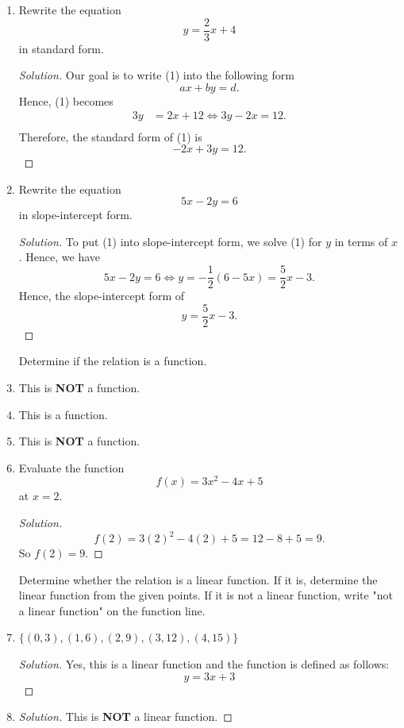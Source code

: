 \documentclass{article}
\begin{document}
\begin{enumerate}
    \begin{proof}[Solution]
    First we put (1) in slope-intercept form by solving for \(y\). Observe that 
    \begin{align*}
        3x + 5y &= 15  \\
        \implies y &= \frac{1}{5}(15 - 3x) \\ 
        \implies y &= 3 - \frac{3}{5} x. 
    \end{align*}
    Since the slope of (1) is \( m = -3/5 \), we must have that the slope of a line perpendicular to it is \( m' = 5 / 3\). Since this perpendicular line goes through \( (0,4 )\), we just have
    \[ y = \frac{5}{3}x + 4.\]
    \end{proof}
\item Rewrite the equation \[ y = \frac{2}{3}x + 4 \tag{1} \] in standard form.
    \begin{proof}[Solution]
    Our goal is to write (1) into the following form 
    \[ ax + by = d.\]
    Hence, (1) becomes 
    \begin{align*}
        3y &= 2x + 12 \iff 3y - 2x = 12. \\
    \end{align*}
    Therefore, the standard form of (1) is 
    \[ -2x + 3y = 12.\]
    \end{proof}
\item Rewrite the equation 
    \[ 5x - 2y = 6 \tag{1}\] in slope-intercept form.
    \begin{proof}[Solution]
    To put (1) into slope-intercept form, we solve (1) for \(y\) in terms of \(x\). Hence, we have \[ 5x -2y = 6 \iff y = -\frac{1}{2} (6 - 5x) = \frac{5}{2}x - 3.\]
    Hence, the slope-intercept form of 
    \[ y = \frac{5}{2}x - 3.\]
    \end{proof}
Determine if the relation is a function. 

\item This is \textbf{NOT} a function. 
\item This is a function.
\item This is \textbf{NOT} a function.
\item Evaluate the function
    \[ f(x) = 3x^2 - 4x + 5\]
at \( x = 2 \). 
\begin{proof}[Solution]
\[ f(2) = 3(2)^2 - 4(2) + 5 = 12 - 8 + 5 = 9.  \]
So \( f(2) = 9 \).
\end{proof}

Determine whether the relation is a linear function. If it is, determine the linear function from the given points. If it is not a linear function, write "not a linear function" on the function line.
\item \( \{ (0,3), (1,6), (2,9), (3,12), (4,15) \}\)
\begin{proof}[Solution]
Yes, this is a linear function and the function is defined as follows:
\[ y = 3x + 3 \]
\end{proof}
\item %
\begin{proof}[Solution]
    This is \textbf{NOT} a linear function.
\end{proof}


\end{enumerate}
\end{document}
